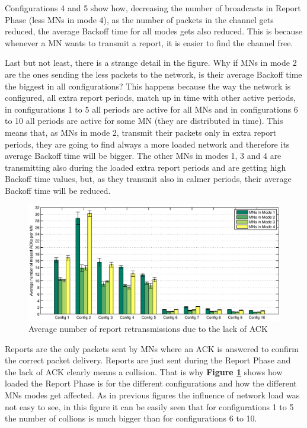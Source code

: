 Configurations 4 and 5 show how, decreasing the number of broadcasts in Report Phase (less \acp{MN} in mode 4), as the number of packets in the channel
gets reduced, the average Backoff time for all modes gets also reduced. This is because whenever a \ac{MN} wants to transmit a report, it is easier to 
find the channel free.

Last but not least, there is a strange detail in the figure. Why if \acp{MN} in mode 2 are the ones sending the less packets to the network, is their 
average Backoff time the biggest in all configurations? This happens because the way the network is configured, all extra report periods, match up in time
with other active periods, in configurations 1 to 5 all periods are active for all \acp{MN} and in configurations 6 to 10 all periods are active for 
some \ac{MN} (they are distributed in time). This means that, as \acp{MN} in mode 2, transmit their packets only in extra report periods, they are going to 
find always a more loaded network and therefore its average Backoff time will be bigger. The other \acp{MN} in modes 1, 3 and 4 are transmitting  
also during the loaded extra report periods and are getting high Backoff time values, but, as they transmit also in calmer periods, their average Backoff time will be reduced.

\begin{figure}[ht]
 \begin{center}
  \includegraphics[width=1\textwidth]{nbMissedACKMN.eps}
 \end{center}
 \caption{Average number of report retransmissions due to the lack of ACK}
 \label{fig:nbMissedACKMN}
\end{figure}

Reports are the only packets sent by \acp{MN} where an \ac{ACK} is answered to confirm the correct packet delivery. Reports are just sent during the
Report Phase and the lack of \ac{ACK} clearly means a collision. That is why \textbf{Figure \ref{fig:nbMissedACKMN}} shows how loaded the Report Phase is
for the different configurations and how the different \acp{MN} modes get affected. As in previous figures the influence of network load was not easy to
see, in this figure it can be easily seen that for configurations 1 to 5 the number of collions is much bigger than for configurations 6 to 10.

